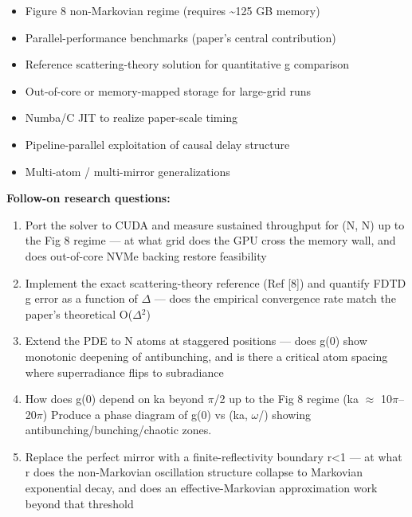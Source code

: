 \documentclass[11pt]{article}
\begin{document}
\begin{itemize}[leftmargin=1.4em,itemsep=0.2em,topsep=0.2em]
\item Figure 8 non-Markovian regime (requires \textasciitilde{}125 GB memory)
\item Parallel-performance benchmarks (paper's central contribution)
\item Reference scattering-theory solution for quantitative g comparison
\item Out-of-core or memory-mapped storage for large-grid runs
\item Numba/C JIT to realize paper-scale timing
\item Pipeline-parallel exploitation of causal delay structure
\item Multi-atom / multi-mirror generalizations
\end{itemize}\noindent\textbf{Follow-on research questions:}
\begin{enumerate}[leftmargin=1.6em,itemsep=0.2em,topsep=0.2em,label=Q\arabic*.]
\item Port the solver to CUDA and measure sustained throughput for (N, N) up to the Fig 8 regime --- at what grid does the GPU cross the memory wall, and does out-of-core NVMe backing restore feasibility
\item Implement the exact scattering-theory reference (Ref [8]) and quantify FDTD g error as a function of $\Delta$ --- does the empirical convergence rate match the paper's theoretical O($\Delta$$^2$)
\item Extend the PDE to N atoms at staggered positions --- does g(0) show monotonic deepening of antibunching, and is there a critical atom spacing where superradiance flips to subradiance
\item How does g(0) depend on ka beyond $\pi$/2 up to the Fig 8 regime (ka $\approx$ 10$\pi$--20$\pi$) Produce a phase diagram of g(0) vs (ka, $\omega$/) showing antibunching/bunching/chaotic zones.
\item Replace the perfect mirror with a finite-reflectivity boundary r\textless{}1 --- at what r does the non-Markovian oscillation structure collapse to Markovian exponential decay, and does an effective-Markovian approximation work beyond that threshold
\end{enumerate}
\end{document}
